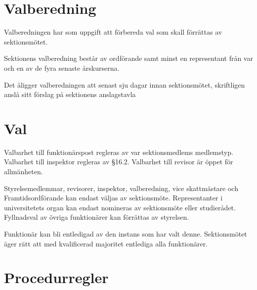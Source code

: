 \documentclass[stadgar]{dsekprotokoll}
\begin{document}
\section{Valberedning}

\begin{stadgeavsnitt}


Valberedningen har som uppgift att förbereda val som skall förrättas av
sektionsmötet.


Sektionens valberedning består av ordförande samt minst en representant
från var och en av de fyra senaste årskurserna.


Det åligger valberedningen att senast sju dagar innan sektionsmötet, skriftligen anslå sitt förslag på sektionens anslagstavla

\end{stadgeavsnitt}

\section{Val}

\begin{stadgeavsnitt}


Valbarhet till funktionärspost regleras av var sektionsmedlems
medlemstyp. Valbarhet till inspektor regleras av \S16.2. Valbarhet till revisor är öppet för
allmänheten.


Styrelsemedlemmar, revisorer, inspektor, valberedning, vice skattmästare och Framtidsordförande kan endast väljas av sektionsmöte.
Representanter i universitetets organ kan endast nomineras av sektionsmöte
eller studierådet. Fyllnadsval av övriga funktionärer kan förrättas av styrelsen.




Funktionär kan bli entledigad av den instans som har valt denne. Sektionsmötet äger rätt
att med kvalificerad majoritet entlediga alla funktionärer.

\end{stadgeavsnitt}

\section{Procedurregler}
\end{document}

